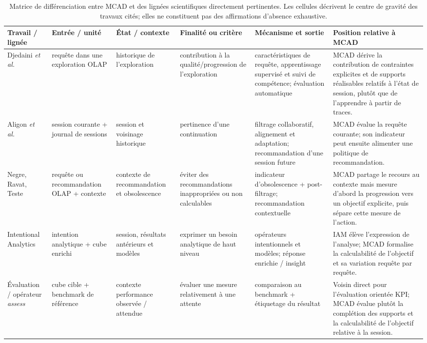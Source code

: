 \begin{table}[!t]
\centering
\caption{Matrice de différenciation entre MCAD et des lignées scientifiques directement pertinentes. Les cellules décrivent le centre de gravité des travaux cités; elles ne constituent pas des affirmations d'absence exhaustive.}
\label{tab:comparative-approaches}
\scriptsize
\setlength{\tabcolsep}{2.0pt}
\renewcommand{\arraystretch}{1.08}
\begin{tabularx}{\textwidth}{@{}p{2.05cm}p{2.15cm}p{2.05cm}p{2.25cm}p{3.45cm}X@{}}
\toprule
Travail / lignée & Entrée / unité & État / contexte & Finalité ou critère & Mécanisme et sortie & Position relative à MCAD \\
\midrule
Djedaini \emph{et al.}~\cite{DjedainiEtAl2019} & requête dans une exploration OLAP & historique de l'exploration & contribution à la qualité/progression de l'exploration & caractéristiques de requête, apprentissage supervisé et suivi de compétence; évaluation automatique & MCAD dérive la contribution de contraintes explicites et de supports réalisables relatifs à l'état de session, plutôt que de l'apprendre à partir de traces. \\
Aligon \emph{et al.}~\cite{AligonDSS2015} & session courante + journal de sessions & session et voisinage historique & pertinence d'une continuation & filtrage collaboratif, alignement et adaptation; recommandation d'une session future & MCAD évalue la requête courante; son indicateur peut ensuite alimenter une politique de recommandation. \\
Negre, Ravat, Teste~\cite{NegreRavatTeste2018} & requête ou recommandation OLAP + contexte & contexte de recommandation et obsolescence & éviter des recommandations inappropriées ou non calculables & indicateur d'obsolescence + post-filtrage; recommandation contextuelle & MCAD partage le recours au contexte mais mesure d'abord la progression vers un objectif explicite, puis sépare cette mesure de l'action. \\
Intentional Analytics~\cite{VassiliadisMarcelRizzi2019,FranciaPredict2026} & intention analytique + cube enrichi & session, résultats antérieurs et modèles & exprimer un besoin analytique de haut niveau & opérateurs intentionnels et modèles; réponse enrichie / insight & IAM élève l'expression de l'analyse; MCAD formalise la calculabilité de l'objectif et sa variation requête par requête. \\
Évaluation / opérateur \emph{assess}~\cite{FranciaAssess2021} & cube cible + benchmark de référence & contexte performance observée / attendue & évaluer une mesure relativement à une attente & comparaison au benchmark + étiquetage du résultat & Voisin direct pour l'évaluation orientée KPI; MCAD évalue plutôt la complétion des supports et la calculabilité de l'objectif relative à la session. \\

\end{tabularx}
\end{table}
